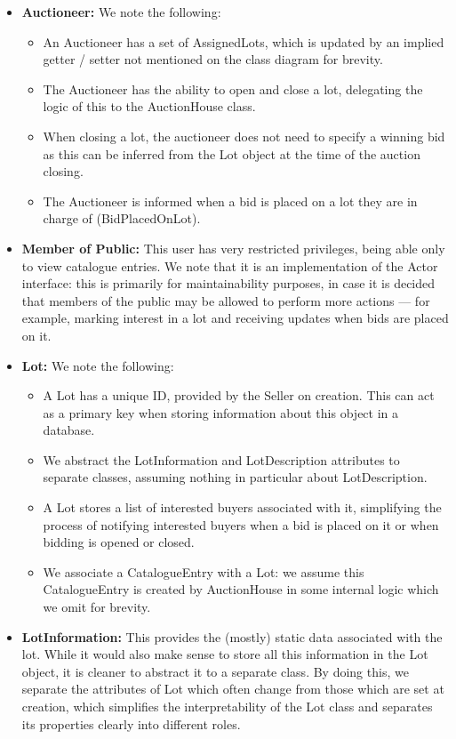 \documentclass[titlepage, 12pt]{extarticle}
\begin{document}
\begin{itemize}
\begin{itemize}
\begin{enumerate}
    \end{enumerate}
  \end{itemize}
\item {\bf Auctioneer: } We note the following:
  \begin{itemize}
    \item An Auctioneer has a set of AssignedLots, which is updated by an implied getter / setter not mentioned on the class diagram for brevity. 
    \item The Auctioneer has the ability to open and close a lot, delegating the logic of this to the AuctionHouse class. 
    \item When closing a lot, the auctioneer does not need to specify a winning bid as this can be inferred from the Lot object at the time of the auction closing. 
    \item The Auctioneer is informed when a bid is placed on a lot they are in charge of (BidPlacedOnLot). 
  \end{itemize}
\item {\bf Member of Public: } This user has very restricted privileges, being able only to view catalogue entries. We note that it is an implementation of the Actor interface: this is primarily for maintainability purposes, in case it is decided that members of the public may be allowed to perform more actions --- for example, marking interest in a lot and receiving updates when bids are placed on it.
\item {\bf Lot: } We note the following:
  \begin{itemize}
    \item A Lot has a unique ID, provided by the Seller on creation. This can act as a primary key when storing information about this object in a database. 
    \item We abstract the LotInformation and LotDescription attributes to separate classes, assuming nothing in particular about LotDescription.
    \item A Lot stores a list of interested buyers associated with it, simplifying the process of notifying interested buyers when a bid is placed on it or when bidding is opened or closed.
    \item We associate a CatalogueEntry with a Lot: we assume this CatalogueEntry is created by AuctionHouse in some internal logic which we omit for brevity.
  \end{itemize}
\item {\bf LotInformation: } This provides the (mostly) static data associated with the lot. While it would also make sense to store all this information in the Lot object, it is cleaner to abstract it to a separate class. By doing this, we separate the attributes of Lot which often change from those which are set at creation, which simplifies the interpretability of the Lot class and separates its properties clearly into different roles. 

\end{itemize}
\end{document}
